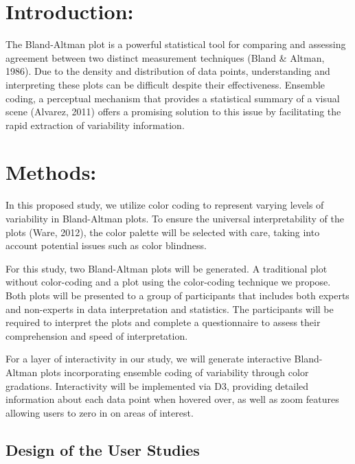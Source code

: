 \documentclass[print]{nuthesis}
\begin{document}
\hypertarget{introduction-3}{%
\section{Introduction:}\label{introduction-3}}

The Bland-Altman plot is a powerful statistical tool for comparing and assessing agreement between two distinct measurement techniques (Bland \& Altman, 1986).
Due to the density and distribution of data points, understanding and interpreting these plots can be difficult despite their effectiveness.
Ensemble coding, a perceptual mechanism that provides a statistical summary of a visual scene (Alvarez, 2011) offers a promising solution to this issue by facilitating the rapid extraction of variability information.

\hypertarget{methods}{%
\section{Methods:}\label{methods}}

In this proposed study, we utilize color coding to represent varying levels of variability in Bland-Altman plots.
To ensure the universal interpretability of the plots (Ware, 2012), the color palette will be selected with care, taking into account potential issues such as color blindness.

For this study, two Bland-Altman plots will be generated.
A traditional plot without color-coding and a plot using the color-coding technique we propose.
Both plots will be presented to a group of participants that includes both experts and non-experts in data interpretation and statistics.
The participants will be required to interpret the plots and complete a questionnaire to assess their comprehension and speed of interpretation.

For a layer of interactivity in our study, we will generate interactive Bland-Altman plots incorporating ensemble coding of variability through color gradations.
Interactivity will be implemented via D3, providing detailed information about each data point when hovered over, as well as zoom features allowing users to zero in on areas of interest.

\hypertarget{design-of-the-user-studies}{%
\subsection{Design of the User Studies}\label{design-of-the-user-studies}}
\end{document}
